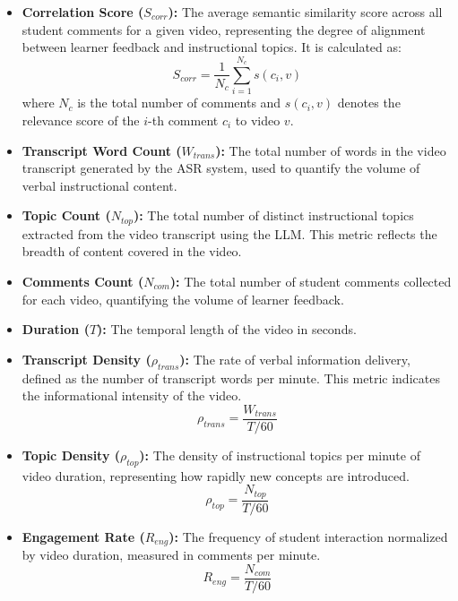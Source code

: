 \documentclass[fleqn,10pt]{JLA_article} %
\begin{document}
\begin{itemize}
    \item \textbf{Correlation Score ($S_{corr}$):} The average semantic similarity score across all student comments for a given video, representing the degree of alignment between learner feedback and instructional topics. It is calculated as:
    \begin{equation}
        S_{corr} = \frac{1}{N_c} \sum_{i=1}^{N_c} s(c_i, v)
    \end{equation}
    where $N_c$ is the total number of comments and $s(c_i, v)$ denotes the relevance score of the $i$-th comment $c_i$ to video $v$.

    \item \textbf{Transcript Word Count ($W_{trans}$):} The total number of words in the video transcript generated by the ASR system, used to quantify the volume of verbal instructional content.

    \item \textbf{Topic Count ($N_{top}$):} The total number of distinct instructional topics extracted from the video transcript using the LLM. This metric reflects the breadth of content covered in the video.

    \item \textbf{Comments Count ($N_{com}$):} The total number of student comments collected for each video, quantifying the volume of learner feedback.

    \item \textbf{Duration ($T$):} The temporal length of the video in seconds.

    \item \textbf{Transcript Density ($\rho_{trans}$):} The rate of verbal information delivery, defined as the number of transcript words per minute. This metric indicates the informational intensity of the video.
    \begin{equation}
        \rho_{trans} = \frac{W_{trans}}{T / 60}
    \end{equation}

    \item \textbf{Topic Density ($\rho_{top}$):} The density of instructional topics per minute of video duration, representing how rapidly new concepts are introduced.
    \begin{equation}
        \rho_{top} = \frac{N_{top}}{T / 60}
    \end{equation}

    \item \textbf{Engagement Rate ($R_{eng}$):} The frequency of student interaction normalized by video duration, measured in comments per minute.
    \begin{equation}
        R_{eng} = \frac{N_{com}}{T / 60}
    \end{equation}


\end{itemize}
\end{document}
